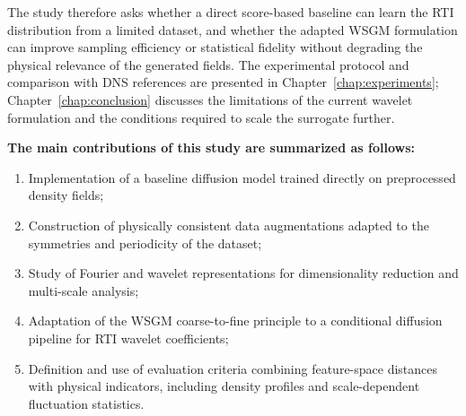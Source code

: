 The study therefore asks whether a direct score-based baseline can learn the RTI distribution from a limited dataset, and whether the adapted WSGM formulation can improve sampling efficiency or statistical fidelity without degrading the physical relevance of the generated fields. The experimental protocol and comparison with DNS references are presented in Chapter~\ref{chap:experiments}; Chapter~\ref{chap:conclusion} discusses the limitations of the current wavelet formulation and the conditions required to scale the surrogate further.

\newpage

\textbf{The main contributions of this study are summarized as follows:}
\begin{enumerate}
    \item Implementation of a baseline diffusion model trained directly on preprocessed density fields;
    \item Construction of physically consistent data augmentations adapted to the symmetries and periodicity of the dataset;
    \item Study of Fourier and wavelet representations for dimensionality reduction and multi-scale analysis;
    \item Adaptation of the WSGM coarse-to-fine principle to a conditional diffusion pipeline for RTI wavelet coefficients;
    \item Definition and use of evaluation criteria combining feature-space distances with physical indicators, including density profiles and scale-dependent fluctuation statistics.
\end{enumerate}
